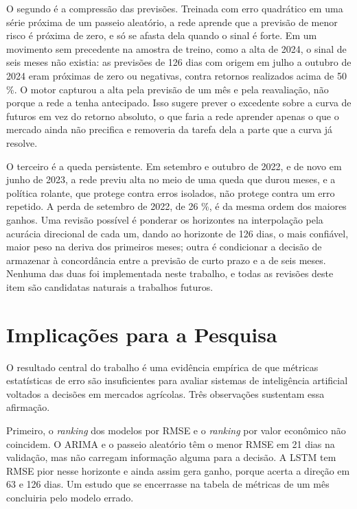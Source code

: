 O segundo é a compressão das previsões. Treinada com erro quadrático em uma série próxima de um passeio aleatório, a rede aprende que a previsão de menor risco é próxima de zero, e só se afasta dela quando o sinal é forte. Em um movimento sem precedente na amostra de treino, como a alta de 2024, o sinal de seis meses não existia: as previsões de 126 dias com origem em julho a outubro de 2024 eram próximas de zero ou negativas, contra retornos realizados acima de 50 \%. O motor capturou a alta pela previsão de um mês e pela reavaliação, não porque a rede a tenha antecipado. Isso sugere prever o excedente sobre a curva de futuros em vez do retorno absoluto, o que faria a rede aprender apenas o que o mercado ainda não precifica e removeria da tarefa dela a parte que a curva já resolve.

O terceiro é a queda persistente. Em setembro e outubro de 2022, e de novo em junho de 2023, a rede previu alta no meio de uma queda que durou meses, e a política rolante, que protege contra erros isolados, não protege contra um erro repetido. A perda de setembro de 2022, de 26 \%, é da mesma ordem dos maiores ganhos. Uma revisão possível é ponderar os horizontes na interpolação pela acurácia direcional de cada um, dando ao horizonte de 126 dias, o mais confiável, maior peso na deriva dos primeiros meses; outra é condicionar a decisão de armazenar à concordância entre a previsão de curto prazo e a de seis meses. Nenhuma das duas foi implementada neste trabalho, e todas as revisões deste item são candidatas naturais a trabalhos futuros.

\section{Implicações para a Pesquisa}\label{sec2:disc-pesquisa}

O resultado central do trabalho é uma evidência empírica de que métricas estatísticas de erro são insuficientes para avaliar sistemas de inteligência artificial voltados a decisões em mercados agrícolas. Três observações sustentam essa afirmação.

Primeiro, o \textit{ranking} dos modelos por RMSE e o \textit{ranking} por valor econômico não coincidem. O ARIMA e o passeio aleatório têm o menor RMSE em 21 dias na validação, mas não carregam informação alguma para a decisão. A LSTM tem RMSE pior nesse horizonte e ainda assim gera ganho, porque acerta a direção em 63 e 126 dias. Um estudo que se encerrasse na tabela de métricas de um mês concluiria pelo modelo errado.

